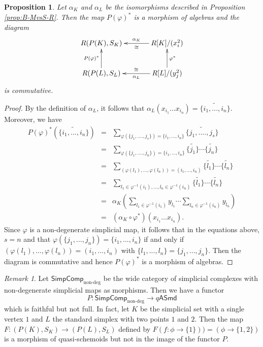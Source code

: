 \documentclass{amsart}
\newtheorem{prop}[thm]{Proposition}
\theoremstyle{definition}
\theoremstyle{remark}
\newtheorem{rem}[thm]{Remark}
\newcommand{\K}{R}%
\newcounter{eqn}[section]
\def\theeqn{\textnormal{(\thesection.\arabic{eqn})}}
\def\eqnlabel#1{%
 \refstepcounter{eqn}%
 \label{#1}%
 \leqno{\theeqn}}
\begin{document}
\begin{prop} Let $\alpha_K$ and $\alpha_L$ be the isomorphisms described in Proposition \ref{prop:B-MvsS-R}. 
Then the map $P(\varphi)^*$ is a morphism of algebras and the diagram 
$$
\xymatrix@C35pt@R25pt{
\K(P(K), S_K) & \K[K]/(x_i^2) \ar[l]^-{\cong}_-{\alpha_K} \\
\K(P(L), S_L)\ar[u]^{P(\varphi)^*} & \K[L]/(y_j^2)\ar[u]_{\varphi^*}  \ar[l]_-{\cong}^-{\alpha_L} 
}
$$ 
is commutative.  
\end{prop}

\begin{proof}
By the definition of $\alpha_L$, it follows that 
$\alpha_L(x_{i_1}\dots x_{i_n})=\widetilde{\{{i_1}, ..., {i_n}\}}$.  Moreover, we have 
\begin{eqnarray*}
P(\varphi)^*(\widetilde{\{{i_1}, ..., {i_n}\}}) &=& 
\sum_{\varphi(\{{j_1}, ...., {j_s}\}) = \{ {i_1}, ..., {i_n}\}} \widetilde{\{{j_1}, ...., {j_s}\}}\\
&=&\sum_{\varphi(\{{j_1}, ...., {j_n}\}) = \{ {i_1}, ..., {i_n}\}} \widetilde{\{{j_1}\}}\cdots \widetilde{\{{j_n}\}}\\
&=& \sum_{(\varphi({l_1}), ..., \varphi({l_n}))= ({i_1}, ..., {i_n})} \widetilde{\{{l_1}\}}\cdots \widetilde{\{{l_n}\}}\\
&=& \sum_{{l_1} \in \varphi^{-1}({i_1}), ..., {l_n} \in \varphi^{-1}({i_n})}\widetilde{\{{l_1}\}}\cdots \widetilde{\{{l_n}\}}\\
&=& \alpha_K(\sum_{{l_1} \in \varphi^{-1}({i_1})}y_{l_1}\cdots \sum_{{l_n} \in \varphi^{-1}({i_n})}y_{l_n})\\
&=& (\alpha_K\circ \varphi^*)(x_{i_1}\dots x_{i_n}). 
\end{eqnarray*}
Since $\varphi$ is a non-degenerate simplicial map, it follows that in the equations above, $s=n$ and that 
$\varphi(\{{j_1}, ..., {j_n}\}) = \{ {i_1}, ..., {i_n}\}$ if and only if $(\varphi({l_1}), ..., \varphi({l_n}))= ({i_1}, ..., {i_n})$ 
with $\{l_1, ..., l_n \} = \{j_1, ..., j_n\}$. Then the diagram is commutative and 
hence $P(\varphi)^*$ is a morphism of algebras. 
\end{proof}

\begin{rem} Let $\mathsf{SimpComp}_{\text{non-deg}}$ be the wide category of simplicial complexes with 
non-degenerate simplicial maps as morphisms.  Then we have a functor 
$$P : \mathsf{SimpComp}_{\text{non-deg}} \to q\mathsf{ASmd}$$ which is faithful but not full. 
In fact, let $K$ be the simplicial set with a single vertex $1$ 
and $L$ the standard simplex with two points $1$ and $2$.  
Then the map $F: (P(K), S_K) \to (P(L), S_L)$  defined by 
$F(f : \phi \to \{1\})) = (\phi \to \{1, 2\})$ is a morphism of quasi-schemoids but not in 
the image of the functor $P$. 
\end{rem}
\end{document}
